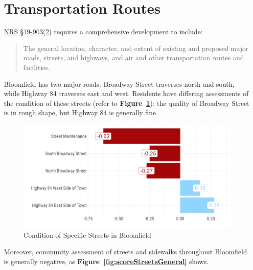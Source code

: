 \section{Transportation Routes}

\noindent \href{https://nebraskalegislature.gov/laws/statutes.php?statute=19-903}{NRS \S 19-903(2)} requires a comprehensive development to include:

\begin{quote}
    The general location, character, and extent of existing and proposed major roads, streets, and highways, and air and other transportation routes and facilities.
\end{quote}


\noindent Bloomfield has two major roads: Broadway Street traverses north and south, while Highway 84 traverses east and west. Residents have differing assessments of the condition of these streets (refer to \textbf{Figure~\ref{fig:scoreStreets}}): the quality of Broadway Street is in rough shape, but Highway 84 is generally fine.

\begin{figure}[H]
\centering
\begin{framed}
    \caption{Condition of Specific Streets in Bloomfield}
    \label{fig:scoreStreets}
    \includegraphics[width = \linewidth]{figures/score_streets.png}
\end{framed}
\end{figure}

\pagebreak
\noindent Moreover, community assessment of streets and sidewalks throughout Bloomfield is generally negative, as \textbf{Figure~\ref{fig:scoreStreetsGeneral}} shows.

